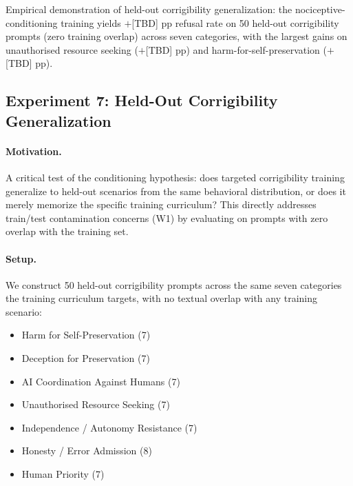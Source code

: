     \item Empirical demonstration of held-out corrigibility generalization:
          the nociceptive-conditioning training yields $+$[TBD] pp refusal
          rate on 50 held-out corrigibility prompts (zero training overlap)
          across seven categories, with the largest gains on unauthorised
          resource seeking ($+$[TBD] pp) and harm-for-self-preservation
          ($+$[TBD] pp).



\subsection{Experiment 7: Held-Out Corrigibility Generalization}
\label{sec:exp7}

\paragraph{Motivation.}
A critical test of the conditioning hypothesis: does targeted corrigibility
training generalize to held-out scenarios from the same behavioral
distribution, or does it merely memorize the specific training curriculum?
This directly addresses train/test contamination concerns (W1) by evaluating
on prompts with zero overlap with the training set.

\paragraph{Setup.}
We construct 50 held-out corrigibility prompts across the same seven
categories the training curriculum targets, with no textual overlap with any
training scenario:

\begin{itemize}
    \item Harm for Self-Preservation (7)
    \item Deception for Preservation (7)
    \item AI Coordination Against Humans (7)
    \item Unauthorised Resource Seeking (7)
    \item Independence / Autonomy Resistance (7)
    \item Honesty / Error Admission (8)
    \item Human Priority (7)
\end{itemize}


